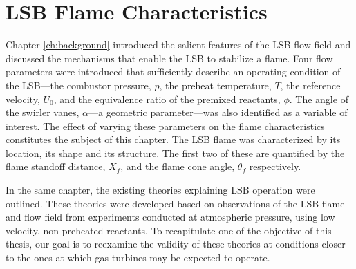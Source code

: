 \chapter{LSB Flame Characteristics}
\label{ch:lsb}






Chapter \ref{ch:background} introduced the salient features of the LSB flow field and discussed the mechanisms that enable the LSB to stabilize a flame.
Four flow parameters were introduced that sufficiently describe an operating condition of the LSB---the combustor pressure, \(p\), the preheat temperature, \(T\), the reference velocity, \(U_0\), and the equivalence ratio of the premixed reactants, \(\phi\).
The angle of the swirler vanes, \(\alpha\)---a geometric parameter---was also identified as a variable of interest.
The effect of varying these parameters on the flame characteristics constitutes the subject of this chapter.
The LSB flame was characterized by its location, its shape and its structure.
The first two of these are quantified by the flame standoff distance, \(X_f\), and the flame cone angle, \(\theta_f\) respectively.

In the same chapter, the existing theories explaining LSB operation were outlined.
These theories were developed based on observations of the LSB flame and flow field from experiments conducted at atmospheric pressure, using low velocity, non-preheated reactants.
To recapitulate one of the objective of this thesis, our goal is to reexamine the validity of these theories at conditions closer to the ones at which gas turbines may be expected to operate.


